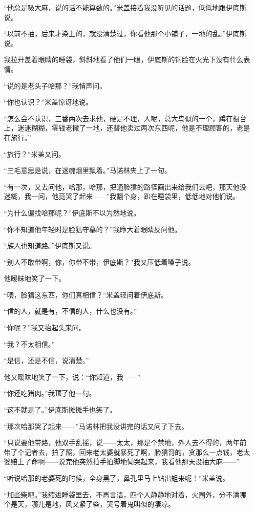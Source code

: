 \par “他总是吸大麻，说的话不能算数的。”米盖接着我没听见的话题，低低地跟伊底斯说。
\par “以前不抽，后来才染上的，就没清楚过，你看他那个小铺子，一地的乱。”伊底斯说。
\par 我拉开盖着眼睛的睡袋，斜斜地看了他们一眼，伊底斯的铜脸在火光下没有什么表情。
\par “说的是老头子哈那？”我悄声问。
\par “你也认识？”米盖惊讶地说。
\par “怎么会不认识，三番两次去求他，硬是不理，人呢，总大鸟似的一个，蹲在橱台上，迷迷糊糊，零钱老撒了一地，还替他卖过两次东西呢，他是不理顾客的，老是在旅行。”
\par “旅行？”米盖又问。
\par “三毛意思是说，在迷魂烟里飘着。”马诺林夹上了一句。
\par “有一次，又去问他，哈那，哈那，把通脸狺的路径画出来给我们去吧，那天他没迷糊，我一问，他竟哭了起来——”我翻个身，趴在睡袋里，低低地对他们说。
\par “为什么偏找哈那呢？”伊底斯不以为然地说。
\par “你不知道他年轻时是脸狺守墓的？”我睁大着眼睛反问他。
\par “族人也知道路。”伊底斯又说。
\par “别人不敢带啊，你，你带不带，伊底斯？”我又压低着嗓子说。
\par 他暧昧地笑了一下。
\par “喂，脸狺这东西，你们真相信？”米盖轻问着伊底斯。
\par “信的人，就是有，不信的人，什么也没有。”
\par “你呢？”我又抬起头来问。
\par “我？不太相信。”
\par “是信，还是不信，说清楚。”
\par 他又暧昧地笑了一下，说：“你知道，我——”
\par “你还吃猪肉。”我顶了他一句。
\par “这不就是了。”伊底斯摊摊手也笑了。
\par “那次哈那哭了起来——”马诺林把我没讲完的话又问了下去。
\par “只说要他带路，他双手乱摇，说——太太，那是个禁地，外人去不得的，两年前带了个记者去，拍了照，回来老太婆就暴死了啊，脸狺罚的，贪那么一点钱，老太婆赔上了命啊——说完他突然拍手拍脚地恸哭起来，我看他那天没抽大麻——”
\par “听说哈那的老婆死的时候，全身黑了，鼻孔里马上钻出蛆来呢！”米盖说。
\par “加些柴吧。”我缩进睡袋里去，不再言语，四个人静静地对着，火圈外，分不清哪个是天，哪儿是地，风又紧了些，哭号着鬼叫似的凄凉。
